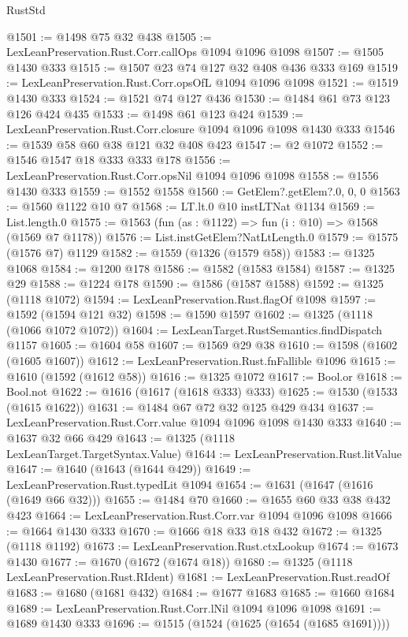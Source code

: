 \begin{lexlean}{RustStd}
\begin{coremodule}
@1501 := @1498 @75 @32 @438
@1505 := LexLeanPreservation.Rust.Corr.callOps @1094 @1096 @1098
@1507 := @1505 @1430 @333
@1515 := @1507 @23 @74 @127 @32 @408 @436 @333 @169
@1519 := LexLeanPreservation.Rust.Corr.opsOfL @1094 @1096 @1098
@1521 := @1519 @1430 @333
@1524 := @1521 @74 @127 @436
@1530 := @1484 @61 @73 @123 @126 @424 @435
@1533 := @1498 @61 @123 @424
@1539 := LexLeanPreservation.Rust.Corr.closure @1094 @1096 @1098 @1430 @333
@1546 := @1539 @58 @60 @38 @121 @32 @408 @423
@1547 := @2 @1072
@1552 := @1546 @1547 @18 @333 @333 @178
@1556 := LexLeanPreservation.Rust.Corr.opsNil @1094 @1096 @1098
@1558 := @1556 @1430 @333
@1559 := @1552 @1558
@1560 := GetElem?.getElem?.{0, 0, 0}
@1563 := @1560 @1122 @10 @7
@1568 := LT.lt.{0} @10 instLTNat @1134
@1569 := List.length.{0}
@1575 := @1563 (fun (as : @1122) => fun (i : @10) => @1568 (@1569 @7 @1178))
@1576 := List.instGetElem?NatLtLength.{0}
@1579 := @1575 (@1576 @7) @1129
@1582 := @1559 (@1326 (@1579 @58))
@1583 := @1325 @1068
@1584 := @1200 @178
@1586 := @1582 (@1583 @1584)
@1587 := @1325 @29
@1588 := @1224 @178
@1590 := @1586 (@1587 @1588)
@1592 := @1325 (@1118 @1072)
@1594 := LexLeanPreservation.Rust.flagOf @1098
@1597 := @1592 (@1594 @121 @32)
@1598 := @1590 @1597
@1602 := @1325 (@1118 (@1066 @1072 @1072))
@1604 := LexLeanTarget.RustSemantics.findDispatch @1157
@1605 := @1604 @58
@1607 := @1569 @29 @38
@1610 := @1598 (@1602 (@1605 @1607))
@1612 := LexLeanPreservation.Rust.fnFallible @1096
@1615 := @1610 (@1592 (@1612 @58))
@1616 := @1325 @1072
@1617 := Bool.or
@1618 := Bool.not
@1622 := @1616 (@1617 (@1618 @333) @333)
@1625 := @1530 (@1533 (@1615 @1622))
@1631 := @1484 @67 @72 @32 @125 @429 @434
@1637 := LexLeanPreservation.Rust.Corr.value @1094 @1096 @1098 @1430 @333
@1640 := @1637 @32 @66 @429
@1643 := @1325 (@1118 LexLeanTarget.TargetSyntax.Value)
@1644 := LexLeanPreservation.Rust.litValue
@1647 := @1640 (@1643 (@1644 @429))
@1649 := LexLeanPreservation.Rust.typedLit @1094
@1654 := @1631 (@1647 (@1616 (@1649 @66 @32)))
@1655 := @1484 @70
@1660 := @1655 @60 @33 @38 @432 @423
@1664 := LexLeanPreservation.Rust.Corr.var @1094 @1096 @1098
@1666 := @1664 @1430 @333
@1670 := @1666 @18 @33 @18 @432
@1672 := @1325 (@1118 @1192)
@1673 := LexLeanPreservation.Rust.ctxLookup
@1674 := @1673 @1430
@1677 := @1670 (@1672 (@1674 @18))
@1680 := @1325 (@1118 LexLeanPreservation.Rust.RIdent)
@1681 := LexLeanPreservation.Rust.readOf
@1683 := @1680 (@1681 @432)
@1684 := @1677 @1683
@1685 := @1660 @1684
@1689 := LexLeanPreservation.Rust.Corr.lNil @1094 @1096 @1098
@1691 := @1689 @1430 @333
@1696 := @1515 (@1524 (@1625 (@1654 (@1685 @1691))))

\end{coremodule}
\end{lexlean}
